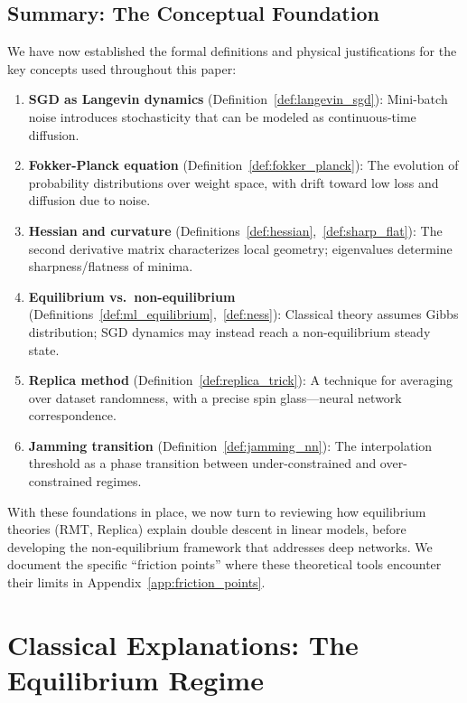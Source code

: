 \documentclass[
  journal=largetwo,
  year=2025,
  volume=37,
]{cup-journal}
\begin{document}
\subsection{Summary: The Conceptual Foundation}

We have now established the formal definitions and physical justifications for the key concepts used throughout this paper:

\begin{enumerate}
    \item \textbf{SGD as Langevin dynamics} (Definition~\ref{def:langevin_sgd}): Mini-batch noise introduces stochasticity that can be modeled as continuous-time diffusion.
    
    \item \textbf{Fokker-Planck equation} (Definition~\ref{def:fokker_planck}): The evolution of probability distributions over weight space, with drift toward low loss and diffusion due to noise.
    
    \item \textbf{Hessian and curvature} (Definitions~\ref{def:hessian},~\ref{def:sharp_flat}): The second derivative matrix characterizes local geometry; eigenvalues determine sharpness/flatness of minima.
    
    \item \textbf{Equilibrium vs.\ non-equilibrium} (Definitions~\ref{def:ml_equilibrium},~\ref{def:ness}): Classical theory assumes Gibbs distribution; SGD dynamics may instead reach a non-equilibrium steady state.
    
    \item \textbf{Replica method} (Definition~\ref{def:replica_trick}): A technique for averaging over dataset randomness, with a precise spin glass---neural network correspondence.
    
    \item \textbf{Jamming transition} (Definition~\ref{def:jamming_nn}): The interpolation threshold as a phase transition between under-constrained and over-constrained regimes.
\end{enumerate}

With these foundations in place, we now turn to reviewing how equilibrium theories (RMT, Replica) explain double descent in linear models, before developing the non-equilibrium framework that addresses deep networks. We document the specific ``friction points'' where these theoretical tools encounter their limits in Appendix~\ref{app:friction_points}.

\section{Classical Explanations: The Equilibrium Regime}
\end{document}
